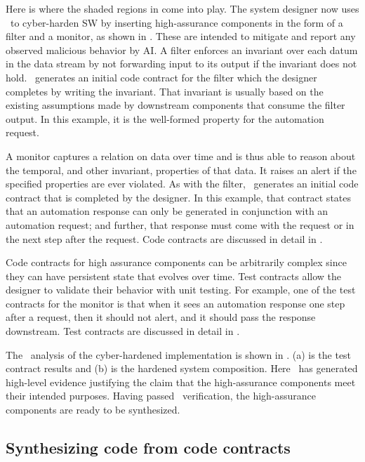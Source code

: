 Here is where the shaded regions in  come into play.
The system designer now uses \brfcs\ to cyber-harden SW by inserting
high-assurance components in the form of a filter and a monitor, as
shown in .
These are intended to mitigate and report any observed malicious behavior by AI.
A filter enforces an invariant over
each datum in the data stream by not forwarding input to its output if the invariant does not hold.
\brfcs\ generates an initial code contract for the filter which the designer completes by writing the invariant.
That invariant is usually based on the existing assumptions made by
downstream components that consume the filter output.
In this example, it is the well-formed property for the automation request.

A monitor captures a relation on data over time and is thus able
to reason about the temporal, and other invariant, properties of that data.  It raises
an alert if the specified properties are ever violated.  
As with the filter, \brfcs\ generates an initial code contract that is completed by the designer. 
In this example, that contract states that an
automation response can only be generated in conjunction with an
automation request; and further, that response must come with the
request or in the next step after the request.  
Code contracts are discussed in detail in .

Code contracts for high assurance components can be arbitrarily complex since they can have persistent state that evolves over time.
Test contracts allow the designer to validate their behavior with unit testing.
For example, one of the test contracts for the monitor is that when it sees an automation response one step after a request, then it should not alert, and it should pass the response downstream.
Test contracts are discussed in detail in .

The \agr\ analysis of the cyber-hardened implementation is shown in
.
(a) is the test contract results and (b) is the hardened system composition.
Here \agr\ has generated high-level
evidence justifying the claim that the high-assurance components meet their intended purposes.
Having passed \agr\ verification, the high-assurance components are ready to be
synthesized.

\subsection{Synthesizing code from code contracts}

